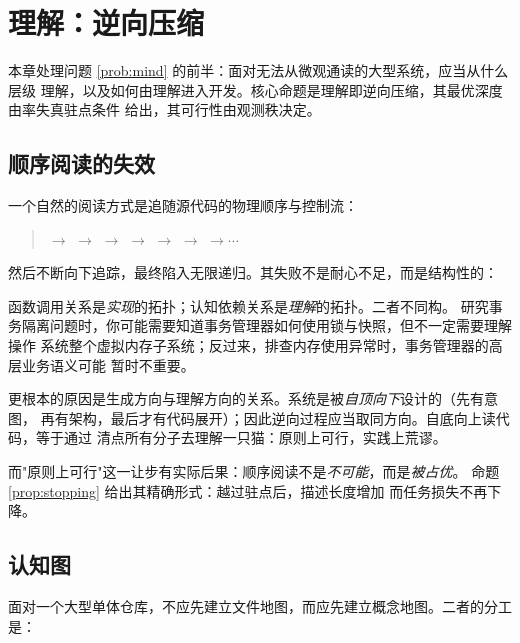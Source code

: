 \chapter[理解：逆向压缩]{理解：逆向压缩}\label{ch:comprehension}

本章处理问题 \ref{prob:mind} 的前半：面对无法从微观通读的大型系统，应当从什么层级
理解，以及如何由理解进入开发。核心命题是理解即逆向压缩，其最优深度由率失真驻点条件
给出，其可行性由观测秩决定。

\section{顺序阅读的失效}\label{sec:why-sequential}

一个自然的阅读方式是追随源代码的物理顺序与控制流：

\begin{quote}
 $\to$  $\to$  $\to$
 $\to$  $\to$  $\to$
 $\to \cdots$
\end{quote}

然后不断向下追踪，最终陷入无限递归。其失败不是耐心不足，而是结构性的：

\begin{principle}[调用关系不等于认知依赖]\label{pr:call-vs-cog}
函数调用关系是\emph{实现}的拓扑；认知依赖关系是\emph{理解}的拓扑。二者不同构。
研究事务隔离问题时，你可能需要知道事务管理器如何使用锁与快照，但不一定需要理解操作
系统整个虚拟内存子系统；反过来，排查内存使用异常时，事务管理器的高层业务语义可能
暂时不重要。
\end{principle}

更根本的原因是生成方向与理解方向的关系。系统是被\emph{自顶向下}设计的（先有意图，
再有架构，最后才有代码展开）；因此逆向过程应当取同方向。自底向上读代码，等于通过
清点所有分子去理解一只猫：原则上可行，实践上荒谬。

而"原则上可行"这一让步有实际后果：顺序阅读不是\emph{不可能}，而是\emph{被占优}。
命题 \ref{prop:stopping} 给出其精确形式：越过驻点后，描述长度增加
而任务损失不再下降。

\section{认知图}\label{sec:maps}

面对一个大型单体仓库，不应先建立文件地图，而应先建立概念地图。二者的分工是：

